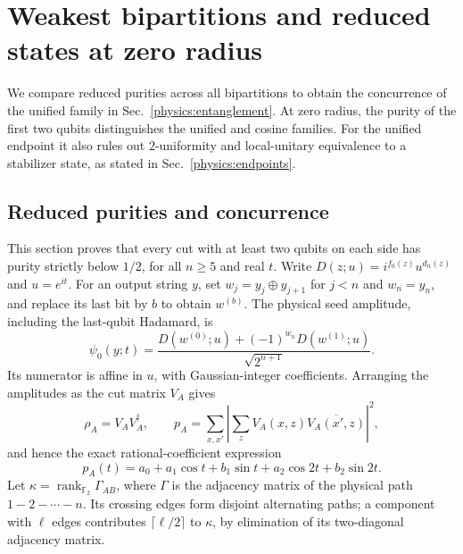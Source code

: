 \section{Weakest bipartitions and reduced states at zero radius}
\label{physics:appendix}

We compare reduced purities across all bipartitions to obtain the concurrence of the unified family in Sec.~\ref{physics:entanglement}. At zero radius, the purity of the first two qubits distinguishes the unified and cosine families. For the unified endpoint it also rules out $2$-uniformity and local-unitary equivalence to a stabilizer state, as stated in Sec.~\ref{physics:endpoints}.

\subsection{Reduced purities and concurrence}
\label{physics:app-purity}

This section proves that every cut with at least two qubits on each side has purity strictly below $1/2$, for all $n\ge5$ and real $t$. Write $D(z;u)=i^{f_0(z)}u^{d_n(z)}$ and $u=e^{it}$. For an output string $y$, set $w_j=y_j\oplus y_{j+1}$ for $j<n$ and $w_n=y_n$, and replace its last bit by $b$ to obtain $w^{(b)}$. The physical seed amplitude, including the last-qubit Hadamard, is
\begin{equation}
 \psi_0(y;t)=\frac{D(w^{(0)};u)+(-1)^{w_n}D(w^{(1)};u)}{\sqrt{2^{n+1}}}.
 \label{physics:amplitudes}
\end{equation}
Its numerator is affine in $u$, with Gaussian-integer coefficients. Arranging the amplitudes as the cut matrix $V_A$ gives
\begin{equation}
 \rho_A=V_AV_A^\dagger,\qquad
 p_A=\sum_{x,x'}\left|\sum_zV_A(x,z)\overline{V_A(x',z)}\right|^2,
 \label{physics:finite-purity}
\end{equation}
and hence the exact rational-coefficient expression
\begin{equation}
 p_A(t)=a_0+a_1\cos t+b_1\sin t+a_2\cos2t+b_2\sin2t.
 \label{physics:fourier-purity}
\end{equation}
Let $\kappa=\operatorname{rank}_{\mathbb F_2}\Gamma_{AB}$, where $\Gamma$ is the adjacency matrix of the physical path $1-2-\cdots-n$. Its crossing edges form disjoint alternating paths; a component with $\ell$ edges contributes $\lceil\ell/2\rceil$ to $\kappa$, by elimination of its two-diagonal adjacency matrix.

